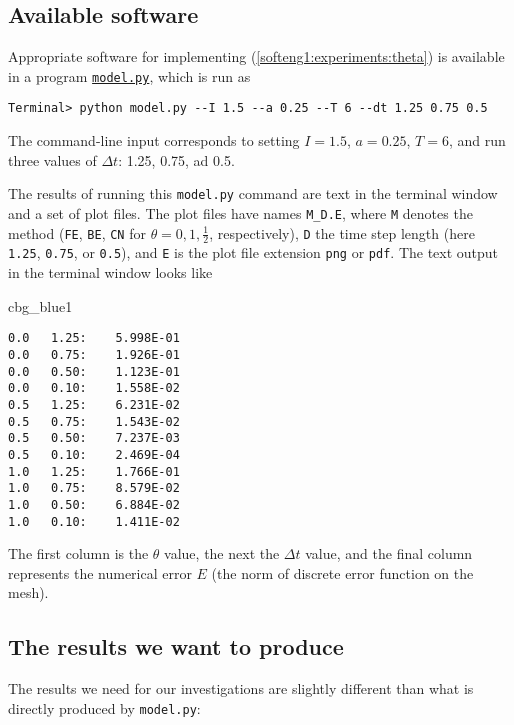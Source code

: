 \documentclass[graybox,sectrefs,envcountresetchap,open=right,final]{svmonodo}
\newenvironment{_cod_tight}[1]{
   \def\FrameCommand{\colorbox{#1}}
   \FrameRule0.6pt\MakeFramed {\FrameRestore}\vskip3mm}
   {\vskip0mm\endMakeFramed}
\newenvironment{cod}[1]{
\bgroup\rmfamily
\fboxsep=0mm\relax
\begin{_cod_tight}{#1}
\list{}{\parsep=-2mm\parskip=0mm\topsep=0pt\leftmargin=2mm
\rightmargin=2\leftmargin\leftmargin=4pt\relax}
\item\relax}
{\endlist\end{_cod_tight}\egroup}
\begin{document}
\subsection{Available software}

Appropriate software for implementing (\ref{softeng1:experiments:theta})
is available in a program \href{{http://tinyurl.com/nc4upel/doconce_src/model.py}}{\nolinkurl{model.py}}, which is run as

\begin{Verbatim}[frame=lines,label=\fbox{{\tiny Terminal}},framesep=2.5mm,framerule=0.7pt,fontsize=\fontsize{9pt}{9pt}]
Terminal> python model.py --I 1.5 --a 0.25 --T 6 --dt 1.25 0.75 0.5
\end{Verbatim}
The command-line input corresponds to setting $I=1.5$, $a=0.25$, $T=6$,
and run three values of $\Delta t$: 1.25, 0.75, ad 0.5.

The results of running this \texttt{model.py} command are text in the
terminal window and a set of plot files.
The plot files have names \Verb!M_D.E!, where \texttt{M} denotes the method
(\texttt{FE}, \texttt{BE}, \texttt{CN} for $\theta=0,1,\frac{1}{2}$, respectively), \texttt{D}
the time step length (here \texttt{1.25}, \texttt{0.75}, or \texttt{0.5}), and \texttt{E}
is the plot file extension \texttt{png} or \texttt{pdf}.
The text output in the terminal window looks like

\begin{cod}{cbg_blue1}\begin{Verbatim}[numbers=none,fontsize=\fontsize{9pt}{9pt},baselinestretch=0.95,xleftmargin=2mm]
0.0   1.25:    5.998E-01
0.0   0.75:    1.926E-01
0.0   0.50:    1.123E-01
0.0   0.10:    1.558E-02
0.5   1.25:    6.231E-02
0.5   0.75:    1.543E-02
0.5   0.50:    7.237E-03
0.5   0.10:    2.469E-04
1.0   1.25:    1.766E-01
1.0   0.75:    8.579E-02
1.0   0.50:    6.884E-02
1.0   0.10:    1.411E-02
\end{Verbatim}
\end{cod}
\noindent
The first column is the $\theta$ value, the next the $\Delta t$ value,
and the final column represents the numerical error $E$ (the
norm of discrete error function on the mesh).

\subsection{The results we want to produce}

The results we need for our investigations are slightly different than
what is directly produced by \texttt{model.py}:
\end{document}
